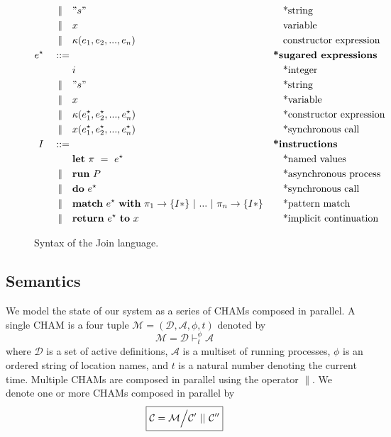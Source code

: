 \begin{figure}
\begin{align*}
\mid\kern-1pt\mid\quad& " s "         && \quad\textrm{*string} \\
\mid\kern-1pt\mid\quad& x               && \quad\textrm{variable} \\
\mid\kern-1pt\mid\quad& \kappa(e_1, e_2, ..., e_n)
                           && \quad\textrm{constructor expression} \\
e^\star\quad ::={}&         && \textbf{*sugared expressions} \\
         & i               && \quad\textrm{*integer} \\
\mid\kern-1pt\mid\quad& " s "         && \quad\textrm{*string} \\
\mid\kern-1pt\mid\quad& x               && \quad\textrm{*variable} \\
\mid\kern-1pt\mid\quad& \kappa(e^\star_1, e^\star_2, ..., e^\star_n)
                           && \quad\textrm{*constructor expression} \\
\mid\kern-1pt\mid\quad& x(e^\star_1, e^\star_2, ..., e^\star_ n)
                           && \quad\textrm{*synchronous call} \\
I\quad ::={}&              && \textbf{*instructions} \\
         & \mathbf{let}~\pi~=~e^\star
                           && \quad\textrm{*named values} \\
\mid\kern-1pt\mid\quad& \mathbf{run}~P  && \quad\textrm{*asynchronous process} \\
\mid\kern-1pt\mid\quad& \mathbf{do}~e^\star && \quad\textrm{*synchronous call} \\
\mid\kern-1pt\mid\quad& \textbf{match}~e^\star~\textbf{with}~\pi_1
               \rightarrow \{ I* \} ~|~ ... ~|~ \pi_n \rightarrow \{ I* \}
                           && \quad\textrm{*pattern match} \\
\mid\kern-1pt\mid\quad& \textbf{return}~e^\star~\textbf{to}~x
                           && \quad\textrm{*implicit continuation}
\end{align*}
\caption{Syntax of the Join language.\label{fig:syntax}}
\end{figure}


\subsection{Semantics}

We model the state of our system as a series of CHAMs composed in parallel. A
single CHAM is a four tuple $\mathcal{M} = (\mathcal{D}, \mathcal{A}, \phi, t)$
denoted by
\begin{equation*}
 \boxed{\mathcal{M} = \mathcal{D} \vdash^\phi_t \mathcal{A}}
\end{equation*}
where $\mathcal{D}$ is a set of active definitions, $\mathcal{A}$ is a multiset
of running processes, $\phi$ is an ordered string of location names, and $t$ is
a natural number denoting the current time. Multiple CHAMs are composed in
parallel using the operator $\parallel$. We denote one or more CHAMs composed
in parallel by
\begin{equation*}
 \boxed{\mathcal{C} = \mathcal{M} \Big\slash \mathcal{C}'~||~\mathcal{C}''}
\end{equation*}

